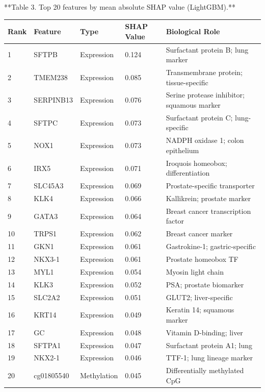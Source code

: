 **Table 3. Top 20 features by mean absolute SHAP value (LightGBM).**
\begin{center}
\begin{tabular}{l l l l l}
\toprule
\textbf{Rank} & \textbf{Feature} & \textbf{Type} & \textbf{SHAP Value} & \textbf{Biological Role} \\
\midrule
1 & SFTPB & Expression & 0.124 & Surfactant protein B; lung marker \\
2 & TMEM238 & Expression & 0.085 & Transmembrane protein; tissue-specific \\
3 & SERPINB13 & Expression & 0.076 & Serine protease inhibitor; squamous
marker \\
4 & SFTPC & Expression & 0.073 & Surfactant protein C; lung-specific \\
5 & NOX1 & Expression & 0.073 & NADPH oxidase 1; colon epithelium \\
6 & IRX5 & Expression & 0.071 & Iroquois homeobox; differentiation \\
7 & SLC45A3 & Expression & 0.069 & Prostate-specific transporter \\
8 & KLK4 & Expression & 0.066 & Kallikrein; prostate marker \\
9 & GATA3 & Expression & 0.064 & Breast cancer transcription factor \\
10 & TRPS1 & Expression & 0.062 & Breast cancer marker \\
11 & GKN1 & Expression & 0.061 & Gastrokine-1; gastric-specific \\
12 & NKX3-1 & Expression & 0.061 & Prostate homeobox TF \\
13 & MYL1 & Expression & 0.054 & Myosin light chain \\
14 & KLK3 & Expression & 0.052 & PSA; prostate biomarker \\
15 & SLC2A2 & Expression & 0.051 & GLUT2; liver-specific \\
16 & KRT14 & Expression & 0.049 & Keratin 14; squamous marker \\
17 & GC & Expression & 0.048 & Vitamin D-binding; liver \\
18 & SFTPA1 & Expression & 0.047 & Surfactant protein A1; lung \\
19 & NKX2-1 & Expression & 0.046 & TTF-1; lung lineage marker \\
20 & cg01805540 & Methylation & 0.045 & Differentially methylated CpG \\
\bottomrule
\end{tabular}
\end{center}

